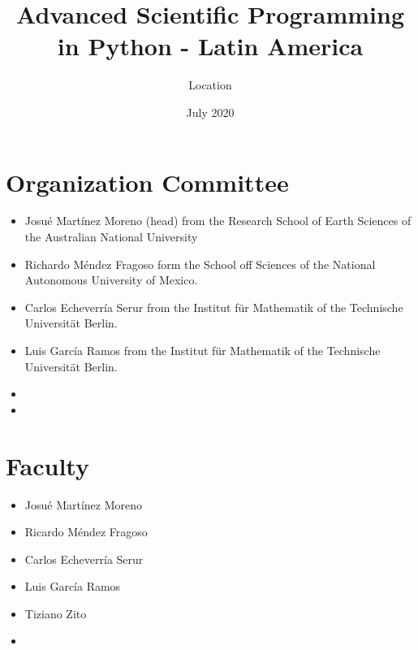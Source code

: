 \documentclass{article}
\title{Advanced Scientific Programming in Python - Latin America}
\date{July 2020}
\author{Location}
\begin{document}
\maketitle

\begin{center}
\end{center}

\section*{Organization Committee}
\begin{itemize}
    \item Josu\'e Mart\'inez Moreno (head) from the Research School of Earth Sciences of the Australian National University
    \item Richardo M\'endez Fragoso form the School off Sciences of the National Autonomous University of Mexico.
    \item Carlos Echeverr\'ia Serur from the Institut für Mathematik of the Technische Universität Berlin.
    \item Luis Garc\'ia Ramos from the Institut für Mathematik of the Technische Universität Berlin.
    \item {}
    \item {}
\end{itemize}

\section*{Faculty}

\begin{itemize}
    \item Josu\'e Mart\'inez Moreno
    \item Ricardo M\'endez Fragoso
    \item Carlos Echeverr\'ia Serur
    \item Luis Garc\'ia Ramos 
    \item Tiziano Zito
    \item {}
\end{itemize}
\end{document}
